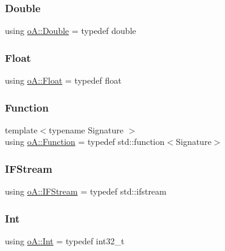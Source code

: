 \subsubsection{\texorpdfstring{Double}{Double}}
{\footnotesize\ttfamily using \mbox{\hyperlink{namespaceo_a_a2bcc976232176d2dcf8b9df1fa33c038}{o\+A\+::\+Double}} = typedef double}

\mbox{\label{namespaceo_a_a513e9cb16924b482268ab3fcdf1f2499}} 
\subsubsection{\texorpdfstring{Float}{Float}}
{\footnotesize\ttfamily using \mbox{\hyperlink{namespaceo_a_a513e9cb16924b482268ab3fcdf1f2499}{o\+A\+::\+Float}} = typedef float}

\mbox{\label{namespaceo_a_a85bea86b9d05d2b86c77d8ee5b7bbde5}} 
\subsubsection{\texorpdfstring{Function}{Function}}
{\footnotesize\ttfamily template$<$typename Signature $>$ \\
using \mbox{\hyperlink{namespaceo_a_a85bea86b9d05d2b86c77d8ee5b7bbde5}{o\+A\+::\+Function}} = typedef std\+::function$<$Signature$>$}

\mbox{\label{namespaceo_a_a5cea26f1078da3e5c2fc4529d6459c94}} 
\subsubsection{\texorpdfstring{I\+F\+Stream}{IFStream}}
{\footnotesize\ttfamily using \mbox{\hyperlink{namespaceo_a_a5cea26f1078da3e5c2fc4529d6459c94}{o\+A\+::\+I\+F\+Stream}} = typedef std\+::ifstream}

\mbox{\label{namespaceo_a_aa575525a7b0116822c73d43fa671a58c}} 
\subsubsection{\texorpdfstring{Int}{Int}}
{\footnotesize\ttfamily using \mbox{\hyperlink{namespaceo_a_aa575525a7b0116822c73d43fa671a58c}{o\+A\+::\+Int}} = typedef int32\+\_\+t}


